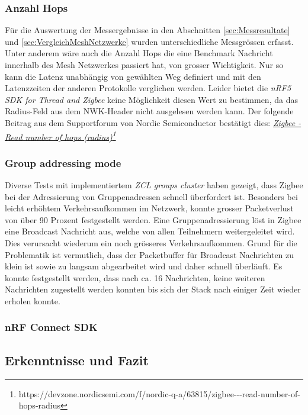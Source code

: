 \subsubsection{Anzahl Hops}\label{subsubsec:AnzahlHops}
Für die Auswertung der Messergebnisse in den Abschnitten \ref{sec:Messresultate} und \ref{sec:VergleichMeshNetzwerke} wurden unterschiedliche Messgrössen erfasst.
Unter anderem wäre auch die Anzahl Hops die eine Benchmark Nachricht innerhalb des Mesh Netzwerkes passiert hat, von grosser Wichtigkeit.
Nur so kann die Latenz unabhängig von gewählten Weg definiert und mit den Latenzzeiten der anderen Protokolle verglichen werden.
Leider bietet die \textit{nRF5 SDK for Thread and Zigbee} keine Möglichkeit diesen Wert zu bestimmen, da das Radius-Feld aus dem NWK-Header nicht ausgelesen werden kann.
Der folgende Beitrag aus dem Supportforum von Nordic Semiconductor bestätigt dies: \href{https://devzone.nordicsemi.com/f/nordic-q-a/63815/zigbee---read-number-of-hops-radius}{\textit{Zigbee - Read number of hops (radius)\footnote{\url{https://devzone.nordicsemi.com/f/nordic-q-a/63815/zigbee---read-number-of-hops-radius}\cite{cyrill_horath_zigbee_2020}}}}


\subsubsection{Group addressing mode}\label{subsubsec:Groupaddressingmode}
Diverse Tests mit implementiertem \textit{ZCL groups cluster} haben gezeigt, dass Zigbee bei der Adressierung von Gruppenadressen schnell überfordert ist.
Besonders bei leicht erhöhtem Verkehrsaufkommen im Netzwerk, konnte grosser Packetverlust von über 90 Prozent festgestellt werden.
Eine Gruppenadressierung löst in Zigbee eine Broadcast Nachricht aus, welche von allen Teilnehmern weitergeleitet wird.
Dies verursacht wiederum ein noch grösseres Verkehrsaufkommen. 
Grund für die Problematik ist vermutlich, dass der Packetbuffer für Broadcast Nachrichten zu klein ist sowie zu langsam abgearbeitet wird und daher schnell überläuft.
Es konnte festgestellt werden, dass nach ca. 16 Nachrichten, keine weiteren Nachrichten zugestellt werden konnten bis sich der Stack nach einiger Zeit wieder erholen konnte.

\subsubsection{nRF Connect SDK}\label{subsubsec:nRFConnectSDK}


\subsection{Erkenntnisse und Fazit}\label{subsec:ErkenntnisseundFazit}




